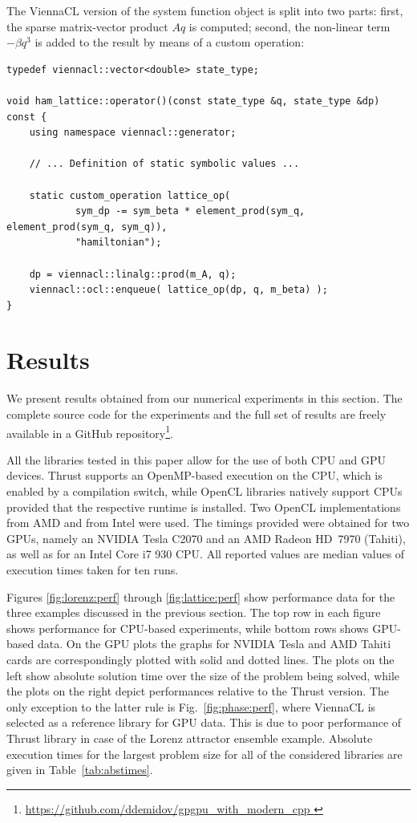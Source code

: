 \documentclass[final]{siamltex}
\newcommand{\figref}[1]{Fig.~\ref{#1}}
\begin{document}
The ViennaCL version of the system function object is split into two parts:
first, the sparse matrix-vector product $Aq$ is computed; second, the
non-linear term $-\beta q^3$ is added to the result by means of a custom
operation:
\begin{lstlisting}
typedef viennacl::vector<double> state_type;

void ham_lattice::operator()(const state_type &q, state_type &dp) const {
    using namespace viennacl::generator;

    // ... Definition of static symbolic values ...

    static custom_operation lattice_op(
            sym_dp -= sym_beta * element_prod(sym_q, element_prod(sym_q, sym_q)),
            "hamiltonian");

    dp = viennacl::linalg::prod(m_A, q);
    viennacl::ocl::enqueue( lattice_op(dp, q, m_beta) );
}
\end{lstlisting}

\section{Results} \label{sec:results}

We present results obtained from our numerical experiments in this section. The
complete source code for the experiments and the full set of results are freely
available in a GitHub repository\footnote{ \href{
https://github.com/ddemidov/gpgpu_with_modern_cpp } {
https://github.com/ddemidov/gpgpu\_with\_modern\_cpp } }.

All the libraries tested in this paper allow for the use of both CPU and GPU
devices.  Thrust supports an OpenMP-based execution on the CPU, which is
enabled by a compilation switch, while OpenCL libraries natively support CPUs
provided that the respective runtime is installed. Two OpenCL implementations
from AMD and from Intel were used.  The timings provided were obtained
for two GPUs, namely an NVIDIA Tesla C2070 and an AMD Radeon HD~7970 (Tahiti),
as well as for an Intel Core i7 930 CPU. All reported values are median values
of execution times taken for ten runs.

Figures \ref{fig:lorenz:perf} through \ref{fig:lattice:perf} show performance
data for the three examples discussed in the previous section.
The top row in each figure shows performance for CPU-based
experiments, while bottom rows shows GPU-based data. On the GPU plots the
graphs for NVIDIA Tesla and AMD Tahiti cards are correspondingly plotted with
solid and dotted lines.
The plots on the left show absolute solution time over the size of the problem
being solved, while the plots on the right depict performances relative to the
Thrust version. The only exception to the latter rule is
\figref{fig:phase:perf}, where ViennaCL is selected as a reference library for
GPU data.  This is due to poor performance of Thrust library in case of the
Lorenz attractor ensemble example.
Absolute execution times for the largest problem size for all of the considered
libraries are given in Table~\ref{tab:abstimes}. 
\end{document}
